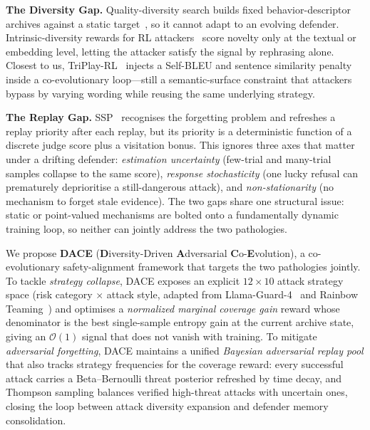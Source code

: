 \documentclass{article}
\newcommand{\method}{\textsc{DACE}\xspace}
\begin{document}
\textbf{The Diversity Gap.}
Quality-diversity search builds fixed behavior-descriptor archives against a static target~\citep{samvelyan2024rainbow, han2024ruby, pala2025ferret, dang2025rainbowplus, wang2025qdrt}, so it cannot adapt to an evolving defender. Intrinsic-diversity rewards for RL attackers~\citep{hong2024curiosity, zhao2025diverct, lee2025gflownet, wang2025jailbreakr1, beutel2024openaidiverse} score novelty only at the textual or embedding level, letting the attacker satisfy the signal by rephrasing alone. Closest to us, TriPlay-RL~\citep{triplayrl2026} injects a Self-BLEU and sentence similarity penalty inside a co-evolutionary loop---still a semantic-surface constraint that attackers bypass by varying wording while reusing the same underlying strategy.

\textbf{The Replay Gap.}
SSP~\citep{ssp2026} recognises the forgetting problem and refreshes a replay priority after each replay, but its priority is a deterministic function of a discrete judge score plus a visitation bonus. This ignores three axes that matter under a drifting defender: \emph{estimation uncertainty} (few-trial and many-trial samples collapse to the same score), \emph{response stochasticity} (one lucky refusal can prematurely deprioritise a still-dangerous attack), and \emph{non-stationarity} (no mechanism to forget stale evidence). The two gaps share one structural issue: static or point-valued mechanisms are bolted onto a fundamentally dynamic training loop, so neither can jointly address the two pathologies.

We propose \textbf{\method} (\textbf{D}iversity-Driven \textbf{A}dversarial \textbf{C}o-\textbf{E}volution), a co-evolutionary safety-alignment framework that targets the two pathologies jointly. To tackle \emph{strategy collapse}, \method exposes an explicit $12\times10$ attack strategy space (risk category $\times$ attack style, adapted from Llama-Guard-4~\citep{llamaguard4_2026} and Rainbow Teaming~\citep{samvelyan2024rainbow}) and optimises a \emph{normalized marginal coverage gain} reward whose denominator is the best single-sample entropy gain at the current archive state, giving an $\mathcal{O}(1)$ signal that does not vanish with training. To mitigate \emph{adversarial forgetting}, \method maintains a unified \emph{Bayesian adversarial replay pool} that also tracks strategy frequencies for the coverage reward: every successful attack carries a Beta--Bernoulli threat posterior refreshed by time decay, and Thompson sampling balances verified high-threat attacks with uncertain ones, closing the loop between attack diversity expansion and defender memory consolidation.
\end{document}
